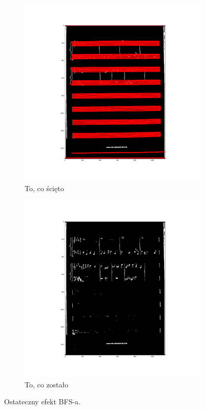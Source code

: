 \documentclass[12pt]{article}
\begin{document}
	\begin{figure}[h!]
		\centering
		\begin{subfigure}[b]{0.48\linewidth}
			\includegraphics[width=\linewidth]{zdj/BFSFinale0.png}
			\caption{To, co ścięto}
		\end{subfigure}
		\begin{subfigure}[b]{0.48\linewidth}
			\includegraphics[width=\linewidth]{zdj/BFSFinale1.png}
			\caption{To, co zostało}
		\end{subfigure}
		\caption{Ostateczny efekt BFS-a.}
		\label{fig:bfsfinale}
	\end{figure}
	
\end{document}
